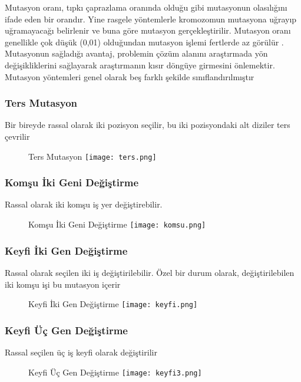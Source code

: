 \documentclass[12pt, a4paper]{article}
\begin{document}
\begin{flushleft}
	Mutasyon oranı, tıpkı çaprazlama oranında olduğu gibi mutasyonun 
	olasılığını ifade eden bir orandır. Yine rasgele yöntemlerle kromozomun mutasyona
	uğrayıp uğramayacağı belirlenir ve buna göre mutasyon gerçekleştirilir. Mutasyon 
	oranı genellikle çok düşük (0,01) olduğundan mutasyon işlemi fertlerde az görülür 
	. \\[5pt]
	Mutasyonun sağladığı avantaj, problemin çözüm alanını araştırmada yön 
	değişikliklerini sağlayarak araştırmanın kısır döngüye girmesini önlemektir. Mutasyon yöntemleri genel olarak beş farklı şekilde sınıflandırılmıştır \\[5pt]
	
	
	\subsubsection{  Ters Mutasyon}
	
	Bir bireyde rassal olarak iki pozisyon seçilir, bu iki pozisyondaki alt diziler 
	ters çevrilir
	
	\begin{figure}[h]
		{ Ters Mutasyon}
		\centering
		\texttt{[image: ters.png]}
		\\[10pt]
	\end{figure}
	\newpage
	\subsubsection{Komşu İki Geni Değiştirme}
	Rassal olarak iki komşu iş yer değiştirebilir.
	
	\begin{figure}[h]
		{ Komşu İki Geni Değiştirme}
		\centering
		\texttt{[image: komsu.png]}
		\\[10pt]
	\end{figure}
	
	\subsubsection{Keyfi İki Gen Değiştirme}	
	Rassal olarak seçilen iki iş değiştirilebilir. Özel bir durum olarak, 
	değiştirilebilen iki komşu işi bu mutasyon içerir
	\begin{figure}[h]
		{ Keyfi İki Gen Değiştirme}
		\centering
		\texttt{[image: keyfi.png]}
		\\[10pt]
	\end{figure}
	
	\subsubsection{Keyfi Üç Gen Değiştirme}	
	Rassal seçilen üç iş keyfi olarak değiştirilir
	\begin{figure}[h]
		{  Keyfi Üç Gen Değiştirme}
		\centering
		\texttt{[image: keyfi3.png]}
		\\[10pt]
	\end{figure}	\newpage	

\end{flushleft}
\end{document}
